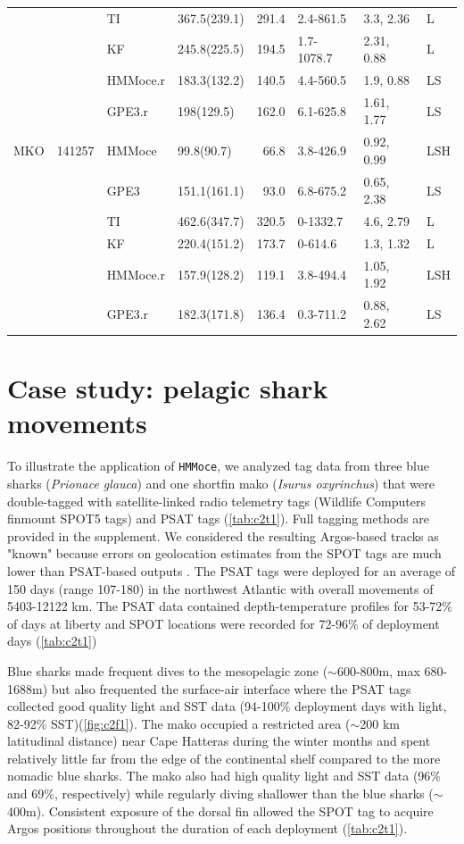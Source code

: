 \begin{table}[h!]
\begin{tabular}[t]{lrllrlll}
 &  & TI & 367.5(239.1) & 291.4 & 2.4-861.5 & 3.3, 2.36 & L\\
 &  & KF & 245.8(225.5) & 194.5 & 1.7-1078.7 & 2.31, 0.88 & L\\
 &  & HMMoce.r & 183.3(132.2) & 140.5 & 4.4-560.5 & 1.9, 0.88 & LS\\
 &  & GPE3.r & 198(129.5) & 162.0 & 6.1-625.8 & 1.61, 1.77 & LS\\
\addlinespace
MKO & 141257 & HMMoce & 99.8(90.7) & 66.8 & 3.8-426.9 & 0.92, 0.99 & LSH\\
 &  & GPE3 & 151.1(161.1) & 93.0 & 6.8-675.2 & 0.65, 2.38 & LS\\
 &  & TI & 462.6(347.7) & 320.5 & 0-1332.7 & 4.6, 2.79 & L\\
 &  & KF & 220.4(151.2) & 173.7 & 0-614.6 & 1.3, 1.32 & L\\
 &  & HMMoce.r & 157.9(128.2) & 119.1 & 3.8-494.4 & 1.05, 1.92 & LSH\\
 &  & GPE3.r & 182.3(171.8) & 136.4 & 0.3-711.2 & 0.88, 2.62 & LS\\
\bottomrule
\end{tabular}
\end{table}

\section{Case study: pelagic shark
movements}

To illustrate the application of \texttt{HMMoce}, we analyzed tag data
from three blue sharks (\emph{Prionace glauca}) and one shortfin mako
(\emph{Isurus oxyrinchus}) that were double-tagged with satellite-linked
radio telemetry tags (Wildlife Computers finmount SPOT5 tags) and PSAT
tags (\cref{tab:c2t1}). Full tagging methods are provided in the
supplement. We considered the resulting Argos-based tracks as "known"
because errors on geolocation estimates from the SPOT tags are much
lower \citep[typically \textless{} 10 km;][]{Witt2010, Patterson2010}
than PSAT-based outputs \citep[\textgreater{} 50 km;][]{Winship2012}.
The PSAT tags were deployed for an average of 150 days (range 107-180)
in the northwest Atlantic with overall movements of 5403-12122 km. The
PSAT data contained depth-temperature profiles for 53-72\% of days at
liberty and SPOT locations were recorded for 72-96\% of deployment days
(\cref{tab:c2t1})

Blue sharks made frequent dives to the mesopelagic zone
($\sim$600-800m, max 680-1688m) but also frequented the
surface-air interface where the PSAT tags collected good quality light
and SST data (94-100\% deployment days with light, 82-92\% SST)(\cref{fig:c2f1}). The mako occupied a restricted area
($\sim$200 km latitudinal distance) near Cape Hatteras during
the winter months and spent relatively little far from the edge of the
continental shelf compared to the more nomadic blue sharks. The mako
also had high quality light and SST data (96\% and 69\%, respectively)
while regularly diving shallower than the blue sharks
($\sim$400m). Consistent exposure of the dorsal fin allowed
the SPOT tag to acquire Argos positions throughout the duration of each
deployment (\cref{tab:c2t1}).

